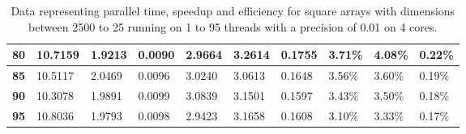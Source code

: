 \begin{table}[ht]
\begin{tabular}{l|l|l|l|l|l|l|l|l|l|}
\multicolumn{1}{|l|}{\textbf{80}} & 10.7159 & 1.9213 & 0.0090 & 2.9664 & 3.2614 & 0.1755 & 3.71\% & 4.08\% & 0.22\% \\ \hline
\multicolumn{1}{|l|}{\textbf{85}} & 10.5117 & 2.0469 & 0.0096 & 3.0240 & 3.0613 & 0.1648 & 3.56\% & 3.60\% & 0.19\% \\ \hline
\multicolumn{1}{|l|}{\textbf{90}} & 10.3078 & 1.9891 & 0.0099 & 3.0839 & 3.1501 & 0.1597 & 3.43\% & 3.50\% & 0.18\% \\ \hline
\multicolumn{1}{|l|}{\textbf{95}} & 10.8036 & 1.9793 & 0.0098 & 2.9423 & 3.1658 & 0.1608 & 3.10\% & 3.33\% & 0.17\% \\ \hline
\end{tabular}
\caption{Data representing parallel time, speedup and efficiency for square arrays with dimensions between 2500 to 25 running on 1 to 95 threads with a precision of 0.01 on 4 cores.}
\end{table}
